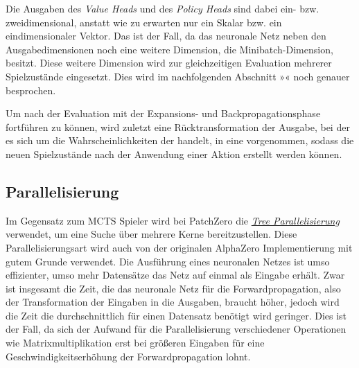 \vspace*{-0.1cm}

\vspace*{-0.2cm}

Die Ausgaben des \emph{Value Heads} und des \emph{Policy Heads} sind dabei ein- bzw. zweidimensional, anstatt wie zu erwarten nur ein Skalar bzw. ein eindimensionaler Vektor. Das ist der Fall, da das neuronale Netz neben den Ausgabedimensionen noch eine weitere Dimension, die Minibatch-Dimension, besitzt. Diese weitere Dimension wird zur gleichzeitigen Evaluation mehrerer Spielzustände eingesetzt. Dies wird im nachfolgenden Abschnitt »« noch genauer besprochen.

\vspace*{-5cm}
\pagebreak

Um nach der Evaluation mit der Expansions- und Backpropagationsphase fortführen zu können, wird zuletzt eine Rücktransformation der Ausgabe, bei der es sich um die Wahrscheinlichkeiten der \hyperref[text:natural-action-id]{} handelt, in eine \hyperref[text:action-id]{} vorgenommen, sodass die neuen Spielzustände nach der Anwendung einer Aktion erstellt werden können.

\subsection{Parallelisierung}
\label{section:erstellung-ansatz-d-parallelisierung}

Im Gegensatz zum \ac{MCTS} Spieler wird bei PatchZero die \hyperref[text:tree-parallelization]{\emph{Tree Parallelisierung}} verwendet, um eine Suche über mehrere Kerne bereitzustellen. Diese Parallelisierungsart wird auch von der originalen AlphaZero Implementierung mit gutem Grunde verwendet. Die Ausführung eines neuronalen Netzes ist umso effizienter, umso mehr Datensätze das Netz auf einmal als Eingabe erhält. Zwar ist insgesamt die Zeit, die das neuronale Netz für die Forwardpropagation, also der Transformation der Eingaben in die Ausgaben, braucht höher, jedoch wird die Zeit die durchschnittlich für einen Datensatz benötigt wird geringer. Dies ist der Fall, da sich der Aufwand für die Parallelisierung verschiedener Operationen wie Matrixmultiplikation erst bei größeren Eingaben für eine Geschwindigkeitserhöhung der Forwardpropagation lohnt. \cite[S. 201f.]{2021.NetworkParallelization}

